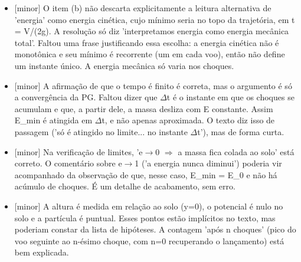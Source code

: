 \documentclass{article}%
\begin{document}
\begin{itemize}%
\item%
{[}minor{]} O item (b) não descarta explicitamente a leitura alternativa de 'energia' como energia cinética, cujo mínimo seria no topo da trajetória, em t = V/(2g). A resolução só diz 'interpretamos energia como energia mecânica total'. Faltou uma frase justificando essa escolha: a energia cinética não é monotônica e seu mínimo é recorrente (um em cada voo), então não define um instante único. A energia mecânica só varia nos choques.%
\item%
{[}minor{]} A afirmação de que o tempo é finito é correta, mas o argumento é só a convergência da PG. Faltou dizer que $\Delta$t é o instante em que os choques se acumulam e que, a partir dele, a massa desliza com E constante. Assim E\_min é atingida em $\Delta$t, e não apenas aproximada. O texto diz isso de passagem ('só é atingido no limite... no instante $\Delta$t'), mas de forma curta.%
\item%
{[}minor{]} Na verificação de limites, 'e$\to$0 $\Rightarrow$ a massa fica colada ao solo' está correto. O comentário sobre e$\to$1 ('a energia nunca diminui') poderia vir acompanhado da observação de que, nesse caso, E\_min = E\_0 e não há acúmulo de choques. É um detalhe de acabamento, sem erro.%
\item%
{[}minor{]} A altura é medida em relação ao solo (y=0), o potencial é nulo no solo e a partícula é puntual. Esses pontos estão implícitos no texto, mas poderiam constar da lista de hipóteses. A contagem 'após n choques' (pico do voo seguinte ao n{-}ésimo choque, com n=0 recuperando o lançamento) está bem explicada.%
\end{itemize}%
\end{document}
